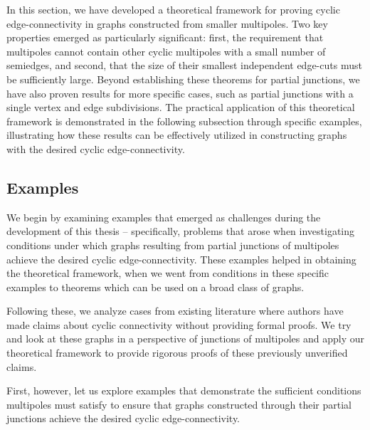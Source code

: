 \documentclass[12pt, twoside]{book}
\begin{document}
In this section, we have developed a theoretical framework for proving cyclic edge-connectivity in graphs constructed from smaller multipoles. Two key properties emerged as particularly significant: first, the requirement that multipoles cannot contain other cyclic multipoles with a small number of semiedges, and second, that the size of their smallest independent edge-cuts must be sufficiently large. Beyond establishing these theorems for partial junctions, we have also proven results for more specific cases, such as partial junctions with a single vertex and edge subdivisions. The practical application of this theoretical framework is demonstrated in the following subsection through specific examples, illustrating how these results can be effectively utilized in constructing graphs with the desired cyclic edge-connectivity.

\subsection{Examples}\label{subs:examples}

We begin by examining examples that emerged as challenges during the development of this thesis -- specifically, problems that arose when investigating conditions under which graphs resulting from partial junctions of multipoles achieve the desired cyclic edge-connectivity. These examples helped in obtaining the theoretical framework, when we went from conditions in these specific examples to theorems which can be used on a broad class of graphs. 

Following these, we analyze cases from existing literature where authors have made claims about cyclic connectivity without providing formal proofs. We try and look at these graphs in a perspective of junctions of multipoles and apply our theoretical framework to provide rigorous proofs of these previously unverified claims.

First, however, let us explore examples that demonstrate the sufficient conditions multipoles must satisfy to ensure that graphs constructed through their partial junctions achieve the desired cyclic edge-connectivity.
\end{document}
